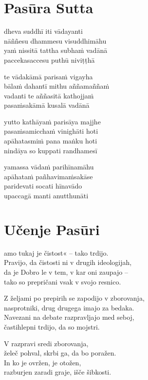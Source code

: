 

\cleartoverso
\chapter*{Pasūra Sutta}

dheva suddhī iti vādayanti\\
nāññesu dhammesu visuddhimāhu\\
yaṁ nissitā tattha subhaṁ vadānā\\
paccekasaccesu puthū niviṭṭhā

te vādakāmā parisaṁ vigayha\\
bālaṁ dahantī mithu aññamaññaṁ\\
vadanti te aññasitā kathojjaṁ\\
pasaṁsakāmā kusalā vadānā

yutto kathāyaṁ parisāya majjhe\\
pasaṁsamicchaṁ vinighāti hoti\\
apāhatasmiṁ pana maṅku hoti\\
nindāya so kuppati randhamesī

yamassa vādaṁ parihīnamāhu\\
apāhataṁ pañhavimaṁsakāse\\
paridevati socati hīnavādo\\
upaccagā manti anutthunāti


\cleartorecto
\chapter*{Učenje Pasūri}

amo tukaj je čistost« -- tako trdijo.\\
Pravijo, da čistosti ni v drugih ideologijah,\\
da je Dobro le v tem, v kar oni zaupajo --\\
tako so prepričani vsak v svojo resnico.

Z željami po prepirih se zapodijo v zborovanja,\\
nasprotniki, drug drugega imajo za bedaka.\\
Navezani na debate razpravljajo med seboj,\\
častihlepni trdijo, da so mojstri.

V razpravi sredi zborovanja,\\
želeč pohval, skrbi ga, da bo poražen.\\
In ko je ovržen, je otožen,\\
razburjen zaradi graje, išče šibkosti.

